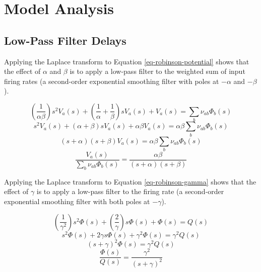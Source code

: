 
\section{Model Analysis}
\label{sect-robinson-math}

%
%
\subsection{Low-Pass Filter Delays}
\label{sect-robinson-math-lowpass}

Applying the Laplace transform to Equation \ref{eq-robinson-potential} shows
that the effect of $\alpha$ and $\beta$ is to apply a low-pass filter to the
weighted sum of input firing rates (a second-order exponential smoothing
filter with poles at $-\alpha$ and $-\beta$).

\begin{equation}
\left ( \frac{1}{\alpha \beta} \right ) s^2 V_a(s)
+ \left ( \frac{1}{\alpha} + \frac{1}{\beta} \right ) s V_a(s)
+ V_a(s) = \sum_b \nu_{ab} \Phi_b(s)
\end{equation}
%
\begin{equation}
s^2 V_a(s) + (\alpha + \beta) s V_a(s) + \alpha \beta V_a(s)
= \alpha \beta \sum_b \nu_{ab} \Phi_b(s)
\end{equation}
%
\begin{equation}
(s + \alpha) (s + \beta) V_a(s) = \alpha \beta \sum_b \nu_{ab} \Phi_b(s)
\end{equation}
%
\begin{equation}
\frac{V_a(s)}{\sum_b \nu_{ab} \Phi_b(s)}
= \frac{\alpha \beta}{(s + \alpha) (s + \beta)}
\end{equation}

Applying the Laplace transform to Equation \ref{eq-robinson-gamma} shows
that the effect of $\gamma$ is to apply a low-pass filter to the firing rate
(a second-order exponential smoothing filter with both poles at $-\gamma$).

\begin{equation}
\left ( \frac{1}{\gamma^2} \right ) s^2 \Phi(s)
+ \left ( \frac{2}{\gamma} \right ) s \Phi(s) + \Phi(s) = Q(s)
\end{equation}
%
\begin{equation}
s^2 \Phi(s) + 2 \gamma s \Phi(s) + \gamma^2 \Phi(s) = \gamma^2 Q(s)
\end{equation}
%
\begin{equation}
(s + \gamma)^2 \Phi(s) = \gamma^2 Q(s)
\end{equation}
%
\begin{equation}
\frac{\Phi(s)}{Q(s)} = \frac{\gamma^2}{(s + \gamma)^2}
\end{equation}

